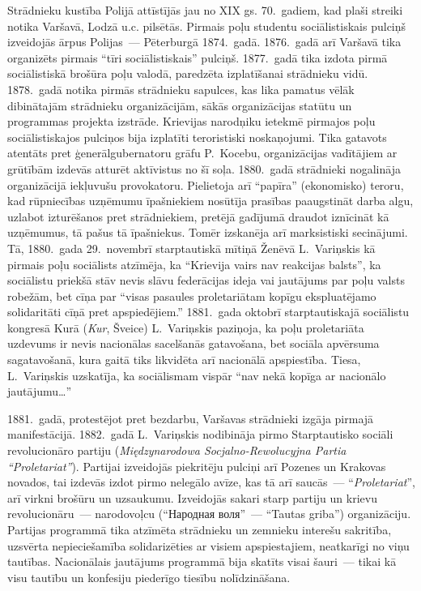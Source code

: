 \documentclass[twoside,a5paper,12pt,fleqn,openany]{extbook}
\newcommand{\pltxti}[1]{\textit{\textpolish{#1}}}
\newcommand{\rutxti}[1]{\textrussian{#1}}
\newcommand{\svtxti}[1]{\textit{\textswedish{#1}}}
\begin{document}
Strādnieku kustība Polijā attīstījās jau no XIX gs. 70.~gadiem, kad plaši streiki notika Varšavā, Lodzā u.c. pilsētās. Pirmais poļu studentu sociālistiskais pulciņš izveidojās ārpus Polijas~--- Pēterburgā 1874.~gadā. 1876.~gadā arī Varšavā tika organizēts pirmais ``tīri sociālistiskais'' pulciņš. 1877.~gadā tika izdota pirmā sociālistiskā brošūra poļu valodā, paredzēta izplatīšanai strādnieku vidū. 1878.~gadā notika pirmās strādnieku sapulces, kas lika pamatus vēlāk dibinātajām strādnieku organizācijām, sākās organizācijas statūtu un programmas projekta izstrāde. Krievijas narodņiku ietekmē pirmajos poļu sociālistiskajos pulciņos bija izplatīti teroristiski noskaņojumi. Tika gatavots atentāts pret ģenerālgubernatoru grāfu P.~Kocebu, organizācijas vadītājiem ar grūtībām izdevās atturēt aktīvistus no šī soļa. 1880.~gadā strādnieki nogalināja organizācijā iekļuvušu provokatoru. Pielietoja arī ``papīra'' (ekonomisko) teroru, kad rūpniecības uzņēmumu īpašniekiem nosūtīja prasības paaugstināt darba algu, uzlabot izturēšanos pret strādniekiem, pretējā gadījumā draudot iznīcināt kā uzņēmumus, tā pašus tā īpašniekus. Tomēr izskanēja arī marksistiski secinājumi. Tā, 1880.~gada 29.~novembrī starptautiskā mītiņā Ženēvā L.~Variņskis kā pirmais poļu sociālists atzīmēja, ka ``Krievija vairs nav reakcijas balsts'', ka sociālistu priekšā stāv nevis slāvu federācijas ideja vai jautājums par poļu valsts robežām, bet cīņa par ``visas pasaules proletariātam kopīgu ekspluatējamo solidaritāti cīņā pret apspiedējiem.'' 1881.~gada oktobrī starptautiskajā sociālistu kongresā Kurā (\svtxti{Kur}, Šveice) L.~Variņskis paziņoja, ka poļu proletariāta uzdevums ir nevis nacionālas sacelšanās gatavošana, bet sociāla apvērsuma sagatavošanā, kura gaitā tiks likvidēta arī nacionālā apspiestība. Tiesa, L.~Variņskis uzskatīja, ka sociālismam vispār ``nav nekā kopīga ar nacionālo jautājumu\dots{}''

1881.~gadā, protestējot pret bezdarbu, Varšavas strādnieki izgāja pirmajā manifestācijā. 1882.~gadā L.~Variņskis nodibināja pirmo Starptautisko sociāli revolucionāro partiju  (\pltxti{Międzynarodowa Socjalno-Rewolucyjna Partia ``Proletariat''}). Partijai izveidojās piekritēju pulciņi arī Pozenes un Krakovas novados, tai izdevās izdot pirmo nelegālo avīze, kas tā arī saucās~--- ``\pltxti{Proletariat}'', arī virkni brošūru un uzsaukumu. Izveidojās sakari starp partiju un krievu revolucionāru~--- narodovoļcu (``\rutxti{Народная воля}''~--- ``Tautas griba'') organizāciju. Partijas programmā tika atzīmēta strādnieku un zemnieku interešu sakritība, uzsvērta nepieciešamība solidarizēties ar visiem apspiestajiem, neatkarīgi no viņu tautības. Nacionālais jautājums programmā bija skatīts visai šauri~--- tikai kā visu tautību un konfesiju piederīgo tiesību nolīdzināšana.
\end{document}
